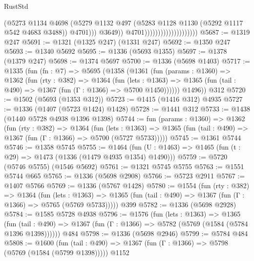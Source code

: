 \begin{lexlean}{RustStd}
\begin{coremodule}
{\begin{coremodule}
{{{{{{{{{{{{{{                                                  (@5273
                                                    @1134
                                                    @4698
                                                    (@5279
                                                      @1132
                                                      @497
                                                      (@5283
                                                        @1128
                                                        @1130
                                                        (@5292 @1117 @542 @4683 @3488))
                                                      @4701)))
                                                @3649))
                                            @4701))))))))))))))))))))
@5687 := @1319 @247
@5691 := @1321 (@1325 @247) (@1331 @247)
@5692 := @1350 @247
@5693 := @1340 @5692
@5695 := @1336 (@5693 @1355)
@5697 := @1378 (@1379 @247)
@5698 := @1374 @5697
@5700 := @1336 (@5698 @1403)
@5717 := @1335
    (fun (fn : @7) =>
    @5695
      (@1358
        (@1361
          (fun (params : @1360) =>
          @1362
            (fun (rty : @382) =>
            @1364
              (fun (lets : @1363) =>
              @1365 (fun (tail : @490) => @1367 (fun (Γ : @1366) => @5700 @1450))))))
        @1496))
    @312
@5720 := @1502 (@5693 (@1353 @312))
@5723 := @1415 (@1416 @312) @4935
@5727 := @1336 (@1407 (@5723 @1424) @1428)
@5728 := @1441 @312
@5733 := @1438 (@1440 @5728 @4938 @1396 @1398)
@5744 := fun (params : @1360) =>
  @1362
    (fun (rty : @382) =>
    @1364
      (fun (lets : @1363) =>
      @1365 (fun (tail : @490) => @1367 (fun (Γ : @1366) => @5700 (@5727 @5733)))))
@5745 := @1361 @5744
@5746 := @1358 @5745
@5755 := @1464 (fun (U : @1463) => @1465 (fun (t : @29) => @1473 (@1336 (@1479 @4935 @1354) @1490)))
@5759 := @5720 (@5746 @5755) (@1546 @5692)
@5761 := @1321 @5745 @5755
@5763 := @1551 @5744 @665
@5765 := @1336 (@5698 @2908)
@5766 := @5723 @2911
@5767 := @1407 @5766
@5769 := @1336 (@5767 @1428)
@5780 := @1554
    (fun (rty : @382) =>
    @1364
      (fun (lets : @1363) =>
      @1365 (fun (tail : @490) => @1367 (fun (Γ : @1366) => @5765 (@5769 @5733)))))
    @399
@5782 := @1336 (@5698 @2928)
@5784 := @1585 @5728 @4938
@5796 := @1576
    (fun (lets : @1363) =>
    @1365
      (fun (tail : @490) => @1367 (fun (Γ : @1366) => @5782 (@5769 (@1584 (@5784 @1396 @1398))))))
    @484
@5798 := @1336 (@5698 @2946)
@5799 := @5784 @484
@5808 := @1600
    (fun (tail : @490) => @1367 (fun (Γ : @1366) => @5798 (@5769 (@1584 (@5799 @1398)))))
    @1152
}}}}}}}}}}}}}}
\end{coremodule}}
\end{coremodule}
\end{lexlean}

